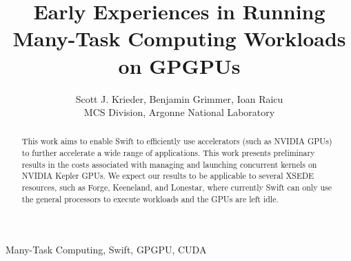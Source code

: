 \documentclass[conference]{IEEEtran}
\begin{document}
%
\title{Early Experiences in Running Many-Task Computing Workloads on GPGPUs}


\author{Scott J. Krieder,
Benjamin Grimmer,
Ioan Raicu\\
MCS Division, Argonne National Laboratory
}


\maketitle


\begin{abstract}
This work aims to enable Swift to efficiently use accelerators (such as NVIDIA GPUs) to further accelerate a wide range of applications. This work presents preliminary results in the costs associated with managing and launching concurrent kernels on NVIDIA Kepler GPUs. We expect our results to be applicable to several XSEDE resources, such as Forge, Keeneland, and Lonestar, where currently Swift can only use the general processors to execute workloads and the GPUs are left idle.
\end{abstract}

\begin{IEEEkeywords}
Many-Task Computing, Swift, GPGPU, CUDA
\end{IEEEkeywords}

\IEEEpeerreviewmaketitle
\end{document}
